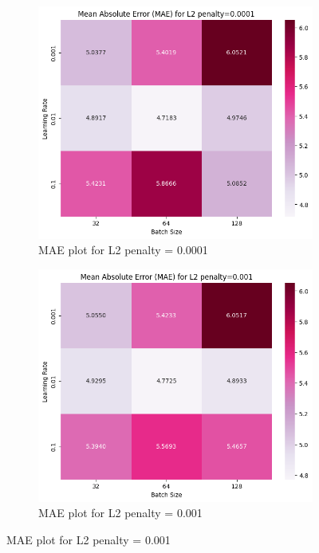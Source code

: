 \documentclass[12pt]{article}
\begin{document}
\begin{enumerate}
\vspace{20pt}


\begin{figure}[h]
    \centering
    \begin{subfigure}{0.48\textwidth}
        \centering
        \includegraphics[width=\textwidth]{./Part II/7_1.png}
        \caption{MAE plot for L2 penalty = 0.0001}
    \end{subfigure}
    \hfill
    \begin{subfigure}{0.48\textwidth}
        \centering
        \includegraphics[width=\textwidth]{./Part II/7_2.png}
        \caption{MAE plot for L2 penalty = 0.001}
    \end{subfigure}


\end{figure}
\end{enumerate}
\end{document}
